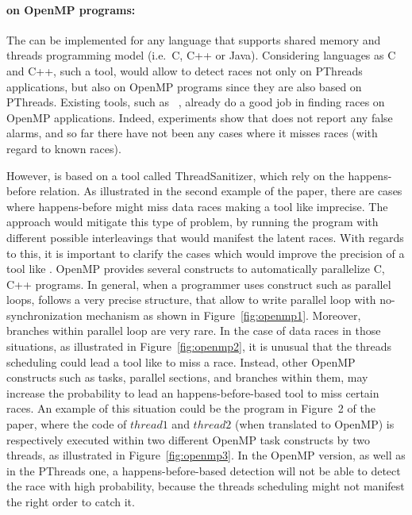\begin{refsection}
\vspace{-10pt}
\paragraph{\rfuz on OpenMP programs:}
The \rfuz can be implemented for any language that supports shared memory and
threads programming model (i.e.\ C, C++ or Java).
%
Considering languages as C and C++, such a tool, would allow to detect races
not only on PThreads applications, but also on OpenMP programs since they are
also based on PThreads.
%
Existing tools, such as \archer~\cite{Protze:2014:TPL:2688361.2688369},
already do a good job in finding races on OpenMP applications.
%
Indeed, experiments show that \archer does not report any false alarms, and so
far there have not been any cases where it misses races (with regard to known
races).

However, \archer is based on a tool called ThreadSanitizer, which rely on the
happens-before relation.
%
As illustrated in the second example of the paper, there are cases where
happens-before might miss data races making a tool like \archer imprecise.
%
The \rfuz approach would mitigate this type of problem, by running the program
with different possible interleavings that would manifest the latent races.
%
With regards to this, it is important to clarify the cases which \rfuz would
improve the precision of a tool like \archer.
%
OpenMP provides several constructs to automatically parallelize C, C++
programs.
%
In general, when a programmer uses construct such as parallel loops, follows a
very precise structure, that allow to write parallel loop with
no-synchronization mechanism as shown in Figure~\ref{fig:openmp1}.
%
Moreover, branches within parallel loop are very rare.
%
In the case of data races in those situations, as illustrated in
Figure~\ref{fig:openmp2}, it is unusual that the threads scheduling could lead
a tool like \archer to miss a race.
%
Instead, other OpenMP constructs such as tasks, parallel sections, and
branches within them, may increase the probability to lead an
happens-before-based tool to miss certain races.
%
An example of this situation could be the program in Figure~2 of the paper,
where the code of $thread1$ and $thread2$ (when translated to OpenMP) is
respectively executed within two different OpenMP task constructs by two
threads, as illustrated in Figure~\ref{fig:openmp3}.
%
In the OpenMP version, as well as in the PThreads one, a happens-before-based
detection will not be able to detect the race with high probability, because
the threads scheduling might not manifest the right order to catch it.


\end{refsection}
